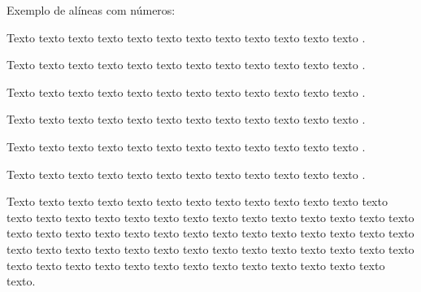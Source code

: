 

    Exemplo de alíneas com números:

    \begin{alineascomnumero}
	    \item Texto texto texto texto texto texto texto texto texto texto texto texto .
	    \item Texto texto texto texto texto texto texto texto texto texto texto texto .
	    \item Texto texto texto texto texto texto texto texto texto texto texto texto .
	    \item Texto texto texto texto texto texto texto texto texto texto texto texto .
	    \item Texto texto texto texto texto texto texto texto texto texto texto texto .
	    \item Texto texto texto texto texto texto texto texto texto texto texto texto .
    \end{alineascomnumero}

    Texto texto texto texto texto texto texto texto texto texto texto texto texto texto texto texto texto texto texto texto texto texto texto texto texto texto texto texto texto texto texto texto texto texto texto texto texto texto texto texto texto texto texto texto texto texto texto texto texto texto texto texto texto texto texto texto texto texto texto texto texto texto texto texto texto texto texto texto texto.

